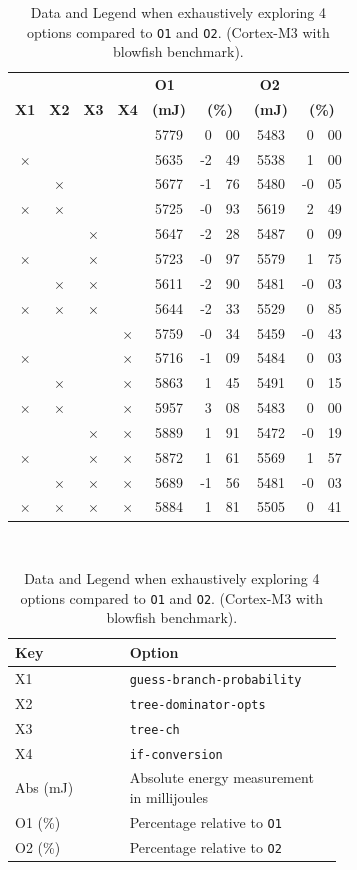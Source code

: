 \documentclass[twocolumn]{article}
\newcommand{\tY}{\checkmark}
\newcommand{\tN}{$\times$}
\let\oldcaption\caption
\renewcommand{\caption}[1]{\oldcaption{\textup{#1}}}
\begin{document}
\begin{table}[tb]
	\centering
	\begin{tabular}{c c c c c r@{.}l c r@{.}l }
		& & & \multicolumn{3}{c}{\hspace{1.5cm}\bfseries O1} & \multicolumn{3}{c}{\hspace{1.3cm}\bfseries O2} \\
		\bfseries X1 & \bfseries X2 & \bfseries X3 & \bfseries X4 & \bfseries (mJ) 	 & \multicolumn{2}{c}{\bfseries (\%)} &
		\bfseries (mJ) 	 & \multicolumn{2}{c}{\bfseries (\%)} \\
		\hline
		\tY&\tY&\tY&\tY& 5779 & 0&00 	&  5483 &  0&00\\
		\tN&\tY&\tY&\tY& 5635 & -2&49 	&  5538 &  1&00\\
		\tY&\tN&\tY&\tY& 5677 & -1&76 	&  5480 & -0&05\\
		\tN&\tN&\tY&\tY& 5725 & -0&93 	&  5619 &  2&49\\
		\tY&\tY&\tN&\tY& 5647 & -2&28 	&  5487 &  0&09\\
		\tN&\tY&\tN&\tY& 5723 & -0&97 	&  5579 &  1&75\\
		\tY&\tN&\tN&\tY& 5611 & -2&90 	&  5481 &  -0&03\\
		\tN&\tN&\tN&\tY& 5644 & -2&33 	&  5529 &  0&85\\

		\tY&\tY&\tY&\tN& 5759 & -0&34 	&  5459 &  -0&43\\
		\tN&\tY&\tY&\tN& 5716 & -1&09 	&  5484 &  0&03\\
		\tY&\tN&\tY&\tN& 5863 & 1&45 	&  5491 &  0&15\\
		\tN&\tN&\tY&\tN& 5957 & 3&08 	&  5483 &  0&00\\
		\tY&\tY&\tN&\tN& 5889 & 1&91 	&  5472 &  -0&19\\
		\tN&\tY&\tN&\tN& 5872 & 1&61 	&  5569 &  1&57\\
		\tY&\tN&\tN&\tN& 5689 & -1&56 	&  5481 &  -0&03\\
		\tN&\tN&\tN&\tN& 5884 & 1&81 	&  5505 &  0&41\\
	\end{tabular}\\[1em]

	\begin{tabular}{l p{0.65\linewidth}}
		\bfseries Key & \bfseries Option \\
		\hline
		X1 & \texttt{guess-branch-probability}  \\
		X2 & \texttt{tree-dominator-opts}  \\
		X3 & \texttt{tree-ch} \\
		X4 & \texttt{if-conversion} \\
		Abs (mJ) & Absolute energy measurement in millijoules \\
		O1 (\%) & Percentage relative to \texttt{O1} \\
		O2 (\%) & Percentage relative to \texttt{O2} \\
	\end{tabular}
	\caption{Data and Legend when exhaustively exploring 4 options compared to \texttt{O1} and \texttt{O2}. (Cortex-M3 with blowfish benchmark).}
	\label{Table:Exhaustive}
\end{table}
\end{document}
